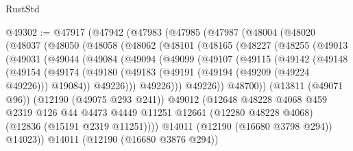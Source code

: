 \begin{lexlean}{RustStd}
\begin{coremodule}
@49302 := @47917
    (@47942
      (@47983
        (@47985
          (@47987
            (@48004
              (@48020
                (@48037
                  (@48050
                    (@48058
                      (@48062
                        (@48101
                          (@48165
                            (@48227
                              (@48255
                                (@49013
                                  (@49031
                                    (@49044
                                      (@49084
                                        (@49094
                                          (@49099
                                            (@49107
                                              (@49115
                                                (@49142
                                                  (@49148
                                                    (@49154
                                                      (@49174
                                                        (@49180
                                                          (@49183
                                                            (@49191
                                                              (@49194 (@49209 (@49224 @49226)))
                                                              @19084))
                                                          @49226)))
                                                    @49226)))
                                              @49226))
                                          @48700))
                                      (@13811 (@49071 @96))
                                      (@12190 (@49075 @293 @241))
                                      @49012
                                      (@12648
                                        @48228
                                        @4068
                                        @459
                                        @2319
                                        @126
                                        @44
                                        @4473
                                        @4449
                                        @11251
                                        @12661
                                        (@12280 @48228 @4068)
                                        (@12836 (@15191 @2319 @11251))))
                                    @14011
                                    (@12190 (@16680 @3798 @294))
                                    @14023))
                                @14011
                                (@12190 (@16680 @3876 @294))

\end{coremodule}
\end{lexlean}
